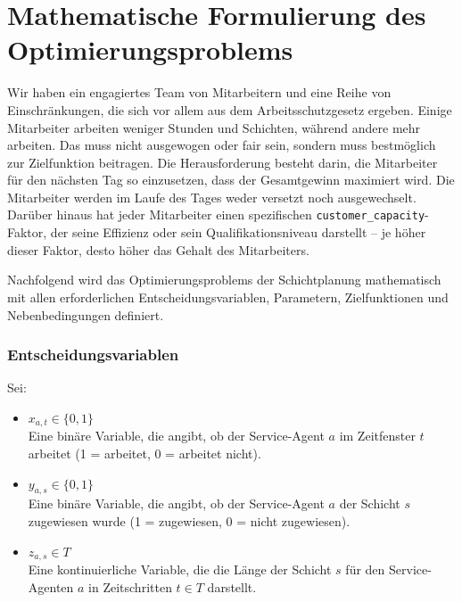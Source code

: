 
\chapter{Mathematische Formulierung des Optimierungsproblems}
Wir haben ein engagiertes Team von Mitarbeitern und eine Reihe von Einschränkungen, die sich vor allem aus dem Arbeitsschutzgesetz ergeben. Einige Mitarbeiter arbeiten weniger Stunden und Schichten, während andere mehr arbeiten. Das muss nicht ausgewogen oder fair sein, sondern muss bestmöglich zur Zielfunktion beitragen. Die Herausforderung besteht darin, die Mitarbeiter für den nächsten Tag so einzusetzen, dass der Gesamtgewinn maximiert wird. Die Mitarbeiter werden im Laufe des Tages weder versetzt noch ausgewechselt. Darüber hinaus hat jeder Mitarbeiter einen spezifischen \texttt{customer_capacity}-Faktor, der seine Effizienz oder sein Qualifikationsniveau darstellt -- je höher dieser Faktor, desto höher das Gehalt des Mitarbeiters.

Nachfolgend wird das Optimierungsproblems der Schichtplanung mathematisch mit allen erforderlichen Entscheidungsvariablen, Parametern, Zielfunktionen und Nebenbedingungen definiert.

\subsection*{Entscheidungsvariablen}
Sei:
\begin{itemize}
    \item $ x_{a,t} \in \{0, 1\} $\\
          Eine binäre Variable, die angibt, ob der Service-Agent $ a $ im Zeitfenster $ t $ arbeitet (1 = arbeitet, 0 = arbeitet nicht).
    \item $ y_{a,s} \in \{0, 1\} $\\
          Eine binäre Variable, die angibt, ob der Service-Agent $ a $ der Schicht $ s $ zugewiesen wurde (1 = zugewiesen, 0 = nicht zugewiesen).
    \item $ z_{a,s} \in T $\\
          Eine kontinuierliche Variable, die die Länge der Schicht $ s $ für den Service-Agenten $ a $ in Zeitschritten $ t \in T $ darstellt.
\end{itemize}

